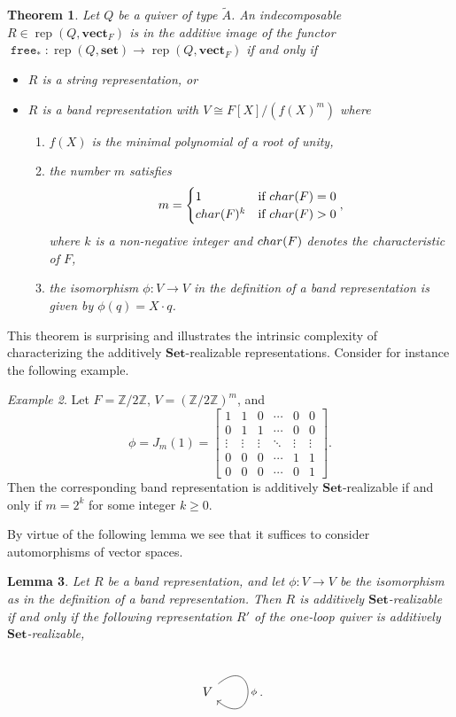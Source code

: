 \documentclass[a4paper]{amsart}
\theoremstyle{plain}
\newtheorem{theorem}{Theorem}[section]
\newtheorem{lemma}[theorem]{Lemma}
\theoremstyle{definition}
\theoremstyle{remark}
\newtheorem{example}[theorem]{Example}
\newcommand{\funct}[1]{\operatorname{\mathtt{#1}}}
\newcommand{\Set}{\mathbf{Set}}
\newcommand{\set}{\mathbf{set}}
\newcommand{\vectF}{\mathbf{vect}_F}
\newcommand{\Z}{\mathbb{Z}}
\DeclareMathOperator{\rep}{rep}
\begin{document}
\begin{theorem}\label{thm.Ainf}
Let \( Q \) be a quiver of type \( \tilde A \). An indecomposable \( R \in \rep( Q, \vectF) \) is in the additive image of the functor \( \funct{free}_* \colon \rep( Q, \set ) \to \rep( Q, \vectF ) \) if and only if
\begin{itemize}
\item $R$ is a string representation, or
\item $R$ is a band representation with $V\cong F[X]/(f(X)^m)$ where
\begin{enumerate}
\item $f(X)$ is the minimal polynomial of a root of unity,
\item the number $m$ satisfies
\[ m = \begin{cases} 1 & \text{if ${\rm char}(F) = 0$} \\ {\rm char}(F)^k & \text{if ${\rm char}(F) > 0$}\end{cases},\]
where $k$ is a non-negative integer and ${\rm char}(F)$ denotes the characteristic of $F$, 
\item the isomorphism $\phi\colon V\to V$ in the definition of a band representation is given by $\phi(q) = X\cdot q$.
\end{enumerate}
\end{itemize}
\end{theorem}
This theorem is surprising and illustrates the intrinsic complexity of characterizing the additively $\Set$-realizable representations. Consider for instance the following example.
\begin{example}
Let $F=\Z/2\Z$, $V=(\Z/2\Z)^m$, and
\[\phi = J_m(1) = 
\begin{bmatrix}
 1 & 1 & 0& \cdots & 0 & 0 \\
 0 & 1 & 1 &\cdots & 0 & 0 \\
\vdots & \vdots & \vdots & \ddots & \vdots & \vdots \\
  0 & 0 & 0 & \cdots & 1 &  1\\
  0 & 0 & 0 & \cdots & 0 & 1
  \end{bmatrix}.\]
Then the corresponding band representation is additively $\Set$-realizable if and only if $m = 2^k$ for some integer $k\geq 0$.
\end{example}

By virtue of the following lemma we see that it suffices to consider automorphisms of vector spaces. 
\begin{lemma}
\label{lem.bandrep}
Let $R$ be a band representation, and let $\phi\colon V\to V$ be the isomorphism as in the definition of a band representation. Then $R$ is additively $\Set$-realizable if and only if the following representation $R'$ of the one-loop quiver is additively $\Set$-realizable, 
 \[\begin{tikzcd}
V \arrow[out=40,in=-40,loop,"\phi"]
\end{tikzcd}.\]
\end{lemma}
\end{document}
